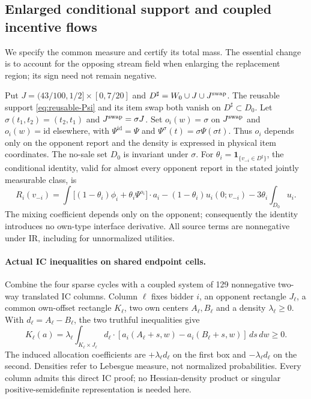 \subsection{Enlarged conditional support and coupled incentive flows}\label{sec:v5-upper}
We specify the common measure and certify its total mass.
The essential change is to account for the opposing stream field when
enlarging the replacement region; its sign need not remain negative.

Put $J=(43/100,1/2]\times[0,7/20]$ and
$D^\sharp=W_0\cup J\cup J^{\rm swap}$. The reusable support
\eqref{eq:reusable-Psi} and its item swap both vanish on $D^\sharp\subset D_0$.
Let $\sigma(t_1,t_2)=(t_2,t_1)$ and $J^{\rm swap}=\sigma J$.
Set $o_i(w)=\sigma$ on $J^{\rm swap}$ and $o_i(w)=\mathrm{id}$ elsewhere,
with $\Psi^{\mathrm{id}}=\Psi$ and $\Psi^\sigma(t)=\sigma\Psi(\sigma t)$.
Thus $o_i$ depends only on the opponent report and the density is expressed
in physical item coordinates. The no-sale set $D_0$ is invariant under
$\sigma$. For $\theta_i=\mathbf1_{\{v_{-i}\in D^\sharp\}}$, the conditional
identity, valid for almost every opponent report in the stated jointly
measurable class, is
\begin{equation}\label{eq:v5-conditional}
 R_i(v_{-i})=\int\big[(1-\theta_i)\phi_i+
                   \theta_i\Psi^{o_i}\big]\cdot a_i
 -(1-\theta_i)u_i(0;v_{-i})-3\theta_i\int_{D_0}u_i.
\end{equation}
The mixing coefficient depends only on the opponent; consequently the
identity introduces no own-type interface derivative. All source terms
are nonnegative under IR, including for unnormalized utilities.

\paragraph{Actual IC inequalities on shared endpoint cells.}
Combine the four sparse cycles with a coupled system of 129 nonnegative
two-way translated IC columns. Column $\ell$ fixes bidder $i$, an opponent
rectangle $J_\ell$, a common own-offset rectangle $K_\ell$, two own centers
$A_\ell,B_\ell$ and a density $\lambda_\ell\ge0$. With
$d_\ell=A_\ell-B_\ell$, the two truthful inequalities give
\[
 K_\ell(a)=\lambda_\ell\int_{K_\ell\times J_\ell}
 d_\ell\cdot[a_i(A_\ell+s,w)-a_i(B_\ell+s,w)]\,ds\,dw\ge0.
\]
The induced allocation coefficients are $+\lambda_\ell d_\ell$ on the
first box and $-\lambda_\ell d_\ell$ on the second. Densities refer to
Lebesgue measure, not normalized probabilities. Every column
admits this direct IC proof; no Hessian-density product or singular
positive-semidefinite representation is needed here.

